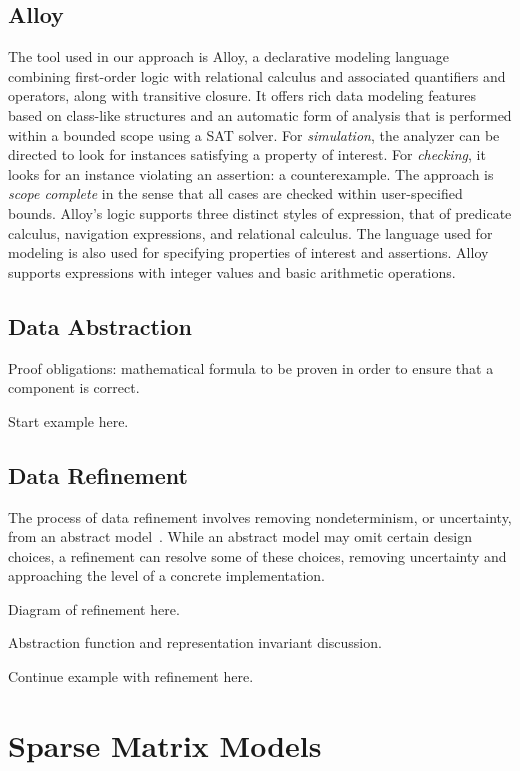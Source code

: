 \documentclass[11pt,conference]{IEEEtran}
\begin{document}
\subsection{Alloy}

The tool used in our approach is Alloy, a declarative modeling language combining first-order logic with relational calculus and associated quantifiers and operators, along with transitive closure.  It offers rich data modeling features based on class-like structures and an automatic form of analysis that is performed within a bounded scope using a SAT solver.  For \emph{simulation}, the analyzer can be directed to look for instances satisfying a property of interest.  For \emph{checking}, it looks for an instance violating an assertion: a counterexample.  The approach is \emph{scope complete} in the sense that all cases are checked within user-specified bounds.  Alloy's logic supports three distinct styles of expression, that of predicate calculus, navigation expressions, and relational calculus.  The language used for modeling is also used for specifying properties of interest and assertions.  Alloy supports expressions with integer values and basic arithmetic operations.

\subsection{Data Abstraction}

Proof obligations: mathematical formula to be proven in order to ensure that a component is correct.

Start example here.

\subsection{Data Refinement}

The process of data refinement involves removing nondeterminism, or uncertainty, from an abstract model~\cite{woodcock1996}.  While an abstract model may omit certain design choices, a refinement can resolve some of these choices, removing uncertainty and approaching the level of a concrete implementation.

Diagram of refinement here.

Abstraction function and representation invariant discussion.

Continue example with refinement here.

\section{Sparse Matrix Models}
\end{document}
